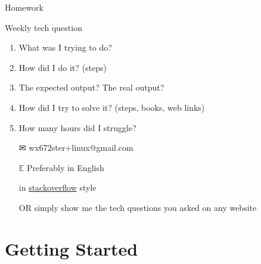 \begin{frame}{{\hw\enspace}Homework}
  \begin{block}{Weekly tech question}
    \begin{enumerate}
    \item What was I trying to do?
    \item How did I do it? (steps)
    \item The expected output? The real output?
    \item How did I try to solve it? (steps, books, web links)
    \item How many hours did I struggle?
    \end{enumerate}
  \end{block}
  \begin{itemize}
  \item[\Large\dejavu ✉] \alert{\ttfamily wx672ster+linux@gmail.com}
  \item[$\mathbb{E}$] Preferably in English
  \item[\stackoverflow] in
    \href{https://stackoverflow.com/questions/39199299/what-is-the-essential-difference-between-compound-command-and-normal-command-inlink}{stackoverflow}
    style
  \item[OR] simply show me the tech questions you asked on any website
  \end{itemize}  
\end{frame}

\begin{frame}
  \begin{center}
  \end{center}
\end{frame}

\section{Getting Started}
\label{sec:start}

